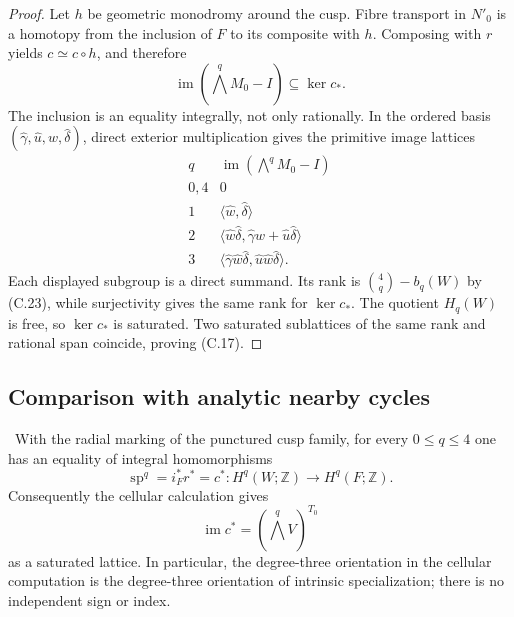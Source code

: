 \begin{proof}
Let $h$ be geometric monodromy around the cusp.  Fibre transport in $N'_0$
is a homotopy from the inclusion of $F$ to its composite with $h$.  Composing
with $r$ yields $c\simeq c\circ h$, and therefore
\[
 \operatorname{im}(\textstyle\bigwedge^qM_0-I)\subseteq\ker c_*.
\tag{C.24}
\]
The inclusion is an equality integrally, not only rationally.  In the ordered
basis $(\widehat\gamma,\widehat u,\widehat w,\widehat\delta)$, direct exterior
multiplication gives the primitive image lattices
\[
\begin{array}{c|c}
q&\operatorname{im}(\bigwedge^qM_0-I)\\ \hline
0,4&0\\
1&\langle\widehat w,\widehat\delta\rangle\\
2&\langle\widehat w\widehat\delta,
          \widehat\gamma\widehat w+\widehat u\widehat\delta\rangle\\
3&\langle\widehat\gamma\widehat w\widehat\delta,
          \widehat u\widehat w\widehat\delta\rangle.
\end{array}
\tag{C.25}
\]
Each displayed subgroup is a direct summand.  Its rank is
$\binom4q-b_q(W)$ by (C.23), while surjectivity gives the same rank for
$\ker c_*$.  The quotient $H_q(W)$ is free, so $\ker c_*$ is saturated.
Two saturated sublattices of the same rank and rational span coincide, proving
(C.17).
\end{proof}

\subsection{Comparison with analytic nearby cycles}

\begin{theorem}
\label{thm:collapse-equals-specialization}
\Verified\ With the radial marking of the punctured cusp family, for every
$0\leq q\leq4$ one has an equality of integral homomorphisms
\[
 \operatorname{sp}^q=i_F^*r^*=c^*:
 H^q(W;\mathbb Z)\longrightarrow H^q(F;\mathbb Z).
\tag{C.26}
\]
Consequently the cellular calculation gives
\[
 \operatorname{im}c^*=(\textstyle\bigwedge^qV)^{T_0}
\]
as a saturated lattice.  In particular, the degree-three orientation in the
cellular computation is the degree-three orientation of intrinsic
specialization; there is no independent sign or index.
\end{theorem}

